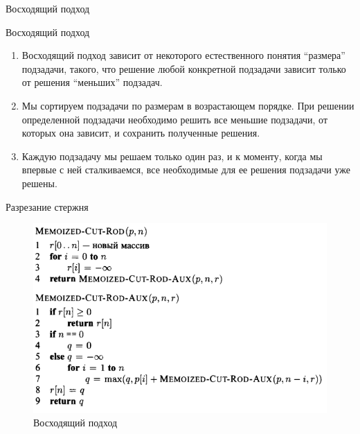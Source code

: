 \documentclass{beamer}
\begin{document}
\begin{frame}[t]{Восходящий подход}
    \begin{block}{Восходящий подход}
        \begin{enumerate}
            \item Восходящий подход зависит от некоторого естественного понятия “размера” подзадачи, такого, что решение любой конкретной подзадачи зависит только от решения “меньших” подзадач. 
            \item Мы сортируем подзадачи по размерам в возрастающем порядке. При решении определенной подзадачи необходимо решить все меньшие подзадачи, от которых она зависит, и сохранить полученные решения. 
            \item Каждую подзадачу мы решаем только один раз, и к моменту, когда мы впервые с ней сталкиваемся, все необходимые для ее решения подзадачи уже решены.
        \end{enumerate}     
    \end{block}
\end{frame}

\begin{frame}[t]{Разрезание стержня}
    \begin{figure}[h]
		\centering
		\includegraphics[scale=0.6]{images/lec09-pic06.png}
		\caption{Восходящий подход}
	\end{figure}
\end{frame}
\end{document}
